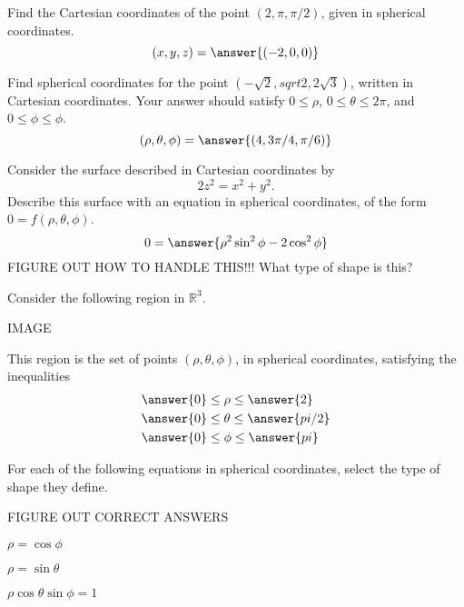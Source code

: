\documentclass{ximera}
\begin{document}
\begin{problem}
Find the Cartesian coordinates of the point $(2, \pi, \pi/2)$, given in spherical coordinates.
\[
(x,y,z) = \answer{(-2,0,0)}
\]
\end{problem}

\begin{problem}
Find spherical coordinates for the point $\left(-\sqrt{2}, sqrt{2}, 2\sqrt{3}\right)$, written in Cartesian coordinates. Your answer should satisfy $0\leq \rho$, $0\leq \theta \leq 2\pi$, and $0\leq \phi \leq \phi$.
\[
(\rho, \theta, \phi) = \answer{(4, 3\pi/4, \pi/6)}
\]
\end{problem}

\begin{problem}
Consider the surface described in Cartesian coordinates by
\[
2z^2 = x^2 +y^2.
\]
Describe this surface with an equation in spherical coordinates, of the form $0=f(\rho, \theta, \phi)$.
\[
0=\answer{\rho^2\sin^2\phi - 2\cos^2\phi}
\]
FIGURE OUT HOW TO HANDLE THIS!!!
What type of shape is this?
\begin{multipleChoice}
\end{multipleChoice}
\end{problem}

\begin{problem}
Consider the following region in $\mathbb{R}^3$.

IMAGE

This region is the set of points $(\rho,\theta,\phi)$, in spherical coordinates, satisfying the inequalities
\begin{align*}
&\answer{0}\leq\rho\leq \answer{2}\\
&\answer{0}\leq\theta\leq\answer{pi/2}\\
&\answer{0}\leq\phi\leq\answer{pi}
\end{align*}

\end{problem}

\begin{problem}
For each of the following equations in spherical coordinates, select the type of shape they define.

FIGURE OUT CORRECT ANSWERS

$\rho = \cos\phi$
\begin{multipleChoice}
\end{multipleChoice}

$\rho = \sin\theta$
\begin{multipleChoice}
\end{multipleChoice}

$\rho\cos\theta\sin\phi = 1$
\begin{multipleChoice}
\end{multipleChoice}
\end{problem}
\end{document}
